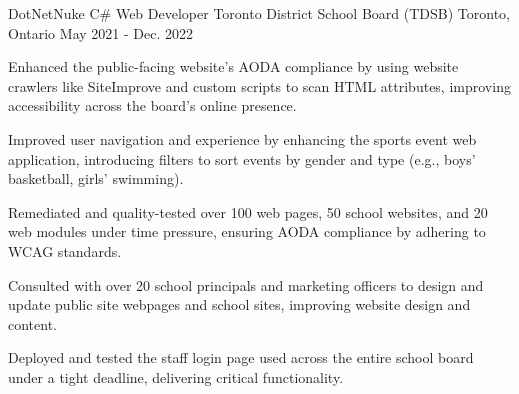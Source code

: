 \begin{cventries}
\cventry
  {DotNetNuke C\# Web Developer} %
  {Toronto District School Board (TDSB)} %
  {Toronto, Ontario} %
  {May 2021 - Dec. 2022} %
  {
    \begin{cvitems} %
      \item {Enhanced the public-facing website's AODA compliance by using website crawlers like SiteImprove and custom scripts to scan HTML attributes, improving accessibility across the board's online presence.}
      \item {Improved user navigation and experience by enhancing the sports event web application, introducing filters to sort events by gender and type (e.g., boys' basketball, girls' swimming).}
      \item {Remediated and quality-tested over 100 web pages, 50 school websites, and 20 web modules under time pressure, ensuring AODA compliance by adhering to WCAG standards.}
      \item {Consulted with over 20 school principals and marketing officers to design and update public site webpages and school sites, improving website design and content.}
      \item {Deployed and tested the staff login page used across the entire school board under a tight deadline, delivering critical functionality.}
    \end{cvitems}
  }



\end{cventries}
